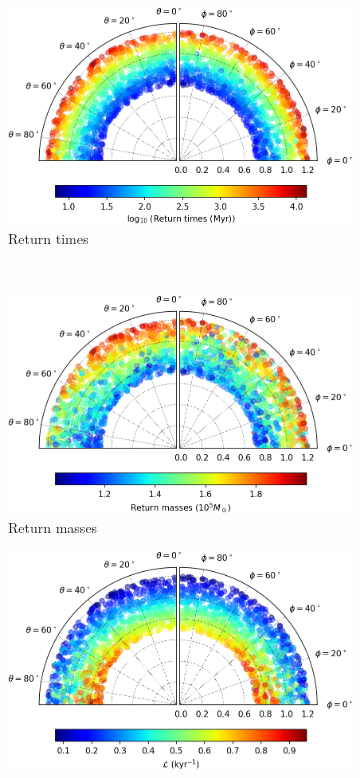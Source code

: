 \begin{figure}[h]
    \centering
    \begin{subfigure}[t]{0.4\textwidth}
        \includegraphics[width = \textwidth]{"../Files/Week 13/images/0_time"}
        \caption{Return times}
    \end{subfigure}
    ~ 
    \begin{subfigure}[t]{0.4\textwidth}
        \includegraphics[width=\textwidth]{"../Files/Week 13/images/0_mass"}
        \caption{Return masses}
    \end{subfigure}
    \begin{subfigure}[t]{0.4\textwidth}
        \includegraphics[width=\textwidth]{"../Files/Week 13/images/0_lyapunov"}

\end{subfigure}
\end{figure}

